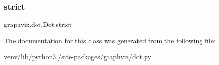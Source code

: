\mbox{\label{classgraphviz_1_1dot_1_1Dot_aa54e02b54826b368aaffd59855fecddf}} 
\subsubsection{\texorpdfstring{strict}{strict}}
{\footnotesize\ttfamily graphviz.\+dot.\+Dot.\+strict}



The documentation for this class was generated from the following file\+:\begin{DoxyCompactItemize}
\item 
venv/lib/python3./site-\/packages/graphviz/\hyperlink{dot_8py}{dot.\+py}\end{DoxyCompactItemize}
